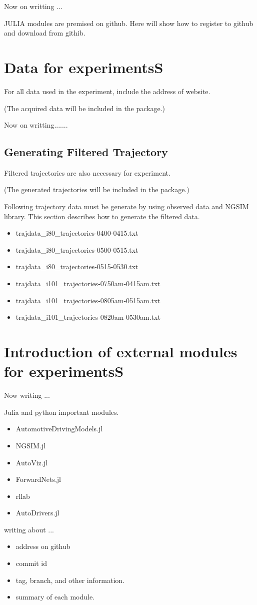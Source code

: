 \documentclass[openany,11pt]{report}%
\begin{document}
Now on writting ...

JULIA modules are premised on github.
Here will show how to register to github and download from githib.


\chapter{Data for experimentsS}

For all data used in the experiment, include the address of website.

(The acquired data will be included in the package.)


Now on writting.......

\section{Generating Filtered Trajectory}

Filtered trajectories are also necessary for experiment.

(The generated trajectories will be included in the package.)

Following trajectory data must be generate by using observed data and NGSIM library.
This section describes how to generate the filtered data. 

\begin{itemize}
\item trajdata\_i80\_trajectories-0400-0415.txt
\item trajdata\_i80\_trajectories-0500-0515.txt
\item trajdata\_i80\_trajectories-0515-0530.txt
\item trajdata\_i101\_trajectories-0750am-0415am.txt
\item trajdata\_i101\_trajectories-0805am-0515am.txt
\item trajdata\_i101\_trajectories-0820am-0530am.txt
\end{itemize}


\chapter{Introduction of external modules for experimentsS}

Now writing ...


Julia and python important modules.

\begin{itemize}
\item AutomotiveDrivingModels.jl
\item NGSIM.jl
\item AutoViz.jl
\item ForwardNets.jl
\item rllab
\item AutoDrivers.jl
\end{itemize}

writing about ...

\begin{itemize}
\item address on github
\item commit id
\item tag, branch, and other information.
\item summary of each module.
\end{itemize}
\end{document}
